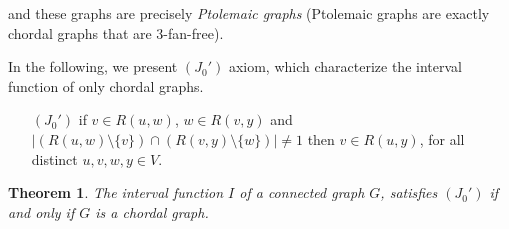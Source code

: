\documentclass[10pt,a4paper]{article}
\newtheorem{theorem}{Theorem}
\begin{document}
and these graphs are precisely \emph{Ptolemaic graphs} (Ptolemaic graphs are exactly chordal graphs that are 3-fan-free).

In the following, we present $(J_{0}')$ axiom, which characterize the interval function of only chordal graphs.

\begin{itemize}
\item[$(J_{0}')$] if $v\in R(u,w)$, $w\in R(v,y)$ and $|(R(u,w)\setminus \{v\})\cap (R(v,y)\setminus \{w\})|\neq 1$ then $v\in R(u,y)$, for all distinct $u,v,w,y \in V$.
\end{itemize}

\begin{theorem}
The interval function $I$ of a connected graph $G$, satisfies $(J_{0}')$ if and only if $G$ is a chordal graph.
\end{theorem}
\end{document}
